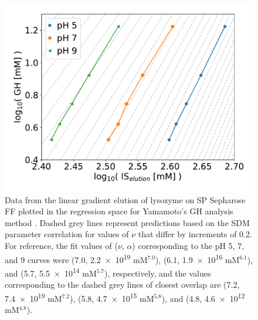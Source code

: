\documentclass[11pt,a4paper]{article}
\begin{document}
\begin{figure}[htbp]
    \centering
    \includegraphics[width=\textwidth]{figure_8}
    \caption{
    Data from the linear gradient elution of lysozyme on SP Sepharose FF plotted in the regression space for Yamamoto's GH analysis method \cite{main-Yamamoto1987}. Dashed grey lines represent predictions based on the SDM parameter correlation for values of $\nu$ that differ by increments of 0.2. For reference, the fit values of ($\nu$, $\alpha$) corresponding to the pH 5, 7, and 9 curves were (7.0, \num{2.2e+19} mM$^{7.0}$), (6.1, \num{1.9e+16} mM$^{6.1}$), and (5.7, \num{5.5e+14} mM$^{5.7}$), respectively, and the values corresponding to the dashed grey lines of closest overlap are (7.2, \num{7.4e19} mM$^{7.2}$), (5.8, \num{4.7e15} mM$^{5.8}$), and (4.8, \num{4.6e12} mM$^{4.8}$).
    }
    \label{fig:lge overlay}
\end{figure}
\end{document}
